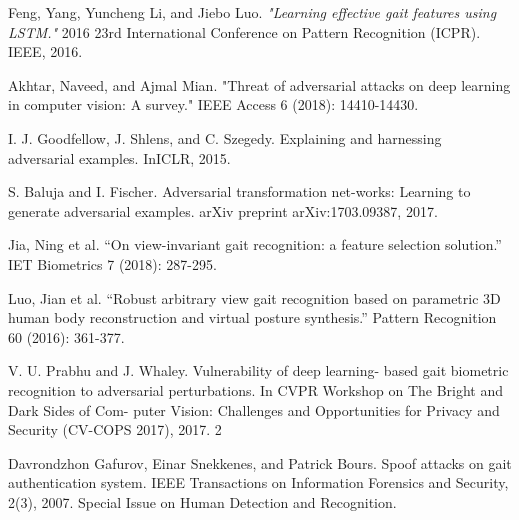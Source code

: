 \documentclass[letterpaper]{article} %
\begin{document}
\smallskip \noindent
[6] Feng, Yang, Yuncheng Li, and Jiebo Luo. \textit{"Learning effective gait features using LSTM."} 2016 23rd International Conference on Pattern Recognition (ICPR). IEEE, 2016.

\smallskip \noindent
[7] Akhtar, Naveed, and Ajmal Mian. "Threat of adversarial attacks on deep learning in computer vision: A survey." IEEE Access 6 (2018): 14410-14430.

\smallskip \noindent
[8] I. J. Goodfellow, J. Shlens, and C. Szegedy. Explaining and harnessing adversarial examples. InICLR, 2015.

\smallskip \noindent
[9] S. Baluja and I. Fischer. Adversarial transformation net-works: Learning to generate adversarial examples. arXiv preprint arXiv:1703.09387, 2017.

\smallskip \noindent
[10] Jia, Ning et al. “On view-invariant gait recognition: a feature selection solution.” IET Biometrics 7 (2018): 287-295.

\smallskip \noindent
[11] Luo, Jian et al. “Robust arbitrary view gait recognition based on parametric 3D human body reconstruction and virtual posture synthesis.” Pattern Recognition 60 (2016): 361-377.

\smallskip \noindent[12]V. U. Prabhu and J. Whaley. Vulnerability of deep learning-
based gait biometric recognition to adversarial perturbations.
In CVPR Workshop on The Bright and Dark Sides of Com-
puter Vision: Challenges and Opportunities for Privacy and
Security (CV-COPS 2017), 2017. 2

\smallskip \noindent [13]Davrondzhon Gafurov, Einar Snekkenes, and Patrick Bours. Spoof attacks on gait
authentication system. IEEE Transactions on Information Forensics and Security,
2(3), 2007. Special Issue on Human Detection and Recognition.
\end{document}
